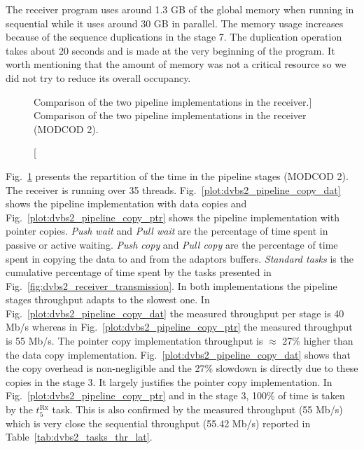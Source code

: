 The receiver program uses around 1.3 GB of the global memory when running in
sequential while it uses around 30 GB in parallel. The memory usage increases
because of the sequence duplications in the stage 7. The duplication operation
takes about 20 seconds and is made at the very beginning of the program. It
worth mentioning that the amount of memory was not a critical resource so we
did not try to reduce its overall occupancy.

\begin{figure}[htp]
  \centering
  \quad
  \caption
    [Comparison of the two pipeline implementations in the receiver.]
    {Comparison of the two pipeline implementations in the receiver (MODCOD 2).}
  \label{plot:dvbs2_pipeline}
\end{figure}

Fig.~\ref{plot:dvbs2_pipeline} presents the repartition of the time in the
pipeline stages (MODCOD 2). The receiver is running over 35 threads.
Fig.~\ref{plot:dvbs2_pipeline_copy_dat} shows the pipeline implementation with
data copies and Fig.~\ref{plot:dvbs2_pipeline_copy_ptr} shows the pipeline
implementation with pointer copies. \emph{Push wait} and \emph{Pull wait} are
the percentage of time spent in passive or active waiting. \emph{Push copy} and
\emph{Pull copy} are the percentage of time spent in copying the data to and
from the adaptors buffers. \emph{Standard tasks} is the cumulative percentage of
time spent by the tasks presented in Fig.~\ref{fig:dvbs2_receiver_transmission}.
In both implementations the pipeline stages throughput adapts to the slowest
one. In Fig.~\ref{plot:dvbs2_pipeline_copy_dat} the measured throughput per
stage is 40 Mb/s whereas in Fig.~\ref{plot:dvbs2_pipeline_copy_ptr} the measured
throughput is 55 Mb/s. The pointer copy implementation throughput is $\approx$
27\% higher than the data copy implementation.
Fig.~\ref{plot:dvbs2_pipeline_copy_dat} shows that the copy overhead is
non-negligible and the 27\% slowdown is directly due to these copies in the
stage 3. It largely justifies the pointer copy implementation. In
Fig.~\ref{plot:dvbs2_pipeline_copy_ptr} and in the stage 3, 100\% of time is
taken by the $t^\text{Rx}_{5}$ task. This is also confirmed by the measured
throughput (55 Mb/s) which is very close the sequential throughput (55.42
Mb/s) reported in Table~\ref{tab:dvbs2_tasks_thr_lat}.

